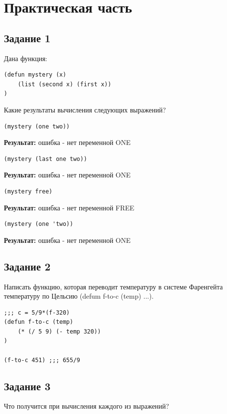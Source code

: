 \chapter{Практическая часть}

\section{Задание \No{}1}

Дана функция:
\begin{lstlisting}
(defun mystery (x)
    (list (second x) (first x))
)
\end{lstlisting}
Какие результаты вычисления следующих выражений?


\begin{lstlisting}
(mystery (one two))
\end{lstlisting}
\textbf{Результат:} ошибка - нет переменной ONE

\begin{lstlisting}
(mystery (last one two))
\end{lstlisting}
\textbf{Результат:} ошибка - нет переменной ONE

\begin{lstlisting}
(mystery free)
\end{lstlisting}
\textbf{Результат:} ошибка - нет переменной FREE

\begin{lstlisting}
(mystery (one 'two))
\end{lstlisting}
\textbf{Результат:} ошибка - нет переменной ONE

\section{Задание \No{}2}

Написать функцию, которая переводит температуру в системе Фаренгейта
температуру по Цельсию (defum f-to-c (temp) ...).

\begin{lstlisting}
;;; c = 5/9*(f-320)
(defun f-to-c (temp)
    (* (/ 5 9) (- temp 320))
)

(f-to-c 451) ;;; 655/9
\end{lstlisting}

\section{Задание \No{}3}

Что получится при вычисления каждого из выражений?

